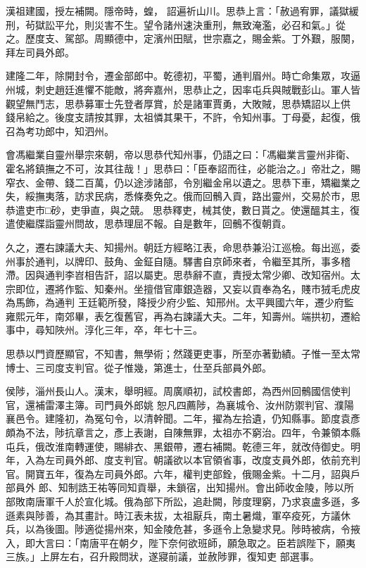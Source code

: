 \begin{pinyinscope}
 漢祖建國，授左補闕。隱帝時，蝗，
 詔遍祈山川。思恭上言：「赦過宥罪，議獄緩刑，茍獄訟平允，則災害不生。望令諸州速決重刑，無致淹濫，必召和氣。」從之。歷度支、駕部。周顯德中，定濱州田賦，世宗嘉之，賜金紫。丁外艱，服闋，拜左司員外郎。



 建隆二年，除開封令，遷金部郎中。乾德初，平蜀，通判眉州。時亡命集眾，攻逼州城，刺史趙廷進懼不能敵，將奔嘉州，思恭止之，因率屯兵與賊戰彭山。軍人皆觀望無鬥志，思恭募軍士先登者厚賞，於是諸軍賈勇，大敗賊，思恭矯詔以上供
 錢帛給之。後度支請按其罪，太祖憐其果干，不許，令知州事。丁母憂，起復，俄召為考功郎中，知泗州。



 會馮繼業自靈州舉宗來朝，帝以思恭代知州事，仍語之曰：「馮繼業言靈州非衛、霍名將鎮撫之不可，汝其往哉！」思恭曰：「臣奉詔而往，必能治之。」帝壯之，賜窄衣、金帶、錢二百萬，仍以途涉諸部，令別繼金帛以遺之。思恭下車，矯繼業之失，綏撫夷落，訪求民病，悉條奏免之。俄而回鶻入貢，路出靈州，交易於市，思恭遣吏市□砂，吏爭直，與之競。
 思恭釋吏，械其使，數日貰之。使還醞其主，復遣使繼牒詣靈州問故，思恭理屈不報。自是數年，回鶻不復朝貢。



 久之，遷右諫議大夫、知揚州。朝廷方經略江表，命思恭兼沿江巡檢。每出巡，委州事於通判，以牌印、鼓角、金鉦自隨。驛書自京師來者，令繼至其所，事多稽滯。因與通判李岧相告訐，詔以屬吏。思恭辭不直，責授太常少卿、改知宿州。太宗即位，遷將作監、知秦州。坐擅借官庫銀造器，又妄以貢奉為名，賤市狨毛虎皮為馬飾，為通判
 王廷範所發，降授少府少監、知邢州。太平興國六年，遷少府監雍熙元年，南郊畢，表乞復舊官，再為右諫議大夫。二年，知壽州。端拱初，遷給事中，尋知陜州。淳化三年，卒，年七十三。



 思恭以門資歷顯官，不知書，無學術；然踐更吏事，所至亦著勤績。子惟一至太常博士、三司度支判官。從子惟幾，第進士，仕至兵部員外郎。



 侯陟，淄州長山人。漢末，舉明經。周廣順初，試校書郎，為西州回鶻國信使判官，還補雷澤主簿。司門員外郎姚
 恕凡四薦陟，為襄城令、汝州防禦判官、濮陽襄邑令。建隆初，為冤句令，以清幹聞。二年，擢為左拾遺，仍知縣事。節度袁彥頗為不法，陟抗章言之，彥上表謝，自陳無罪，太祖亦不窮治。四年，令兼領本縣屯兵，俄改淮南轉運使，賜緋衣、黑銀帶，遷右補闕。乾德三年，就改侍御史。明年，入為左司員外郎、度支判官。朝議欲以本官領省事，改度支員外郎，依前充判官。開寶五年，復為左司員外郎。六年，權判吏部銓，俄賜金紫。十二月，詔與戶部員外
 郎、知制誥王祐等同知貢舉，未鎖宿，出知揚州。會出師收金陵，陟以所部敗南唐軍千人於宣化城。俄為部下所訟，追赴闕，陟度理窮，乃求哀盧多遜，多遜素與陟善，為其畫計。時江表未拔，太祖厭兵，南土暑熾，軍卒疫死，方議休兵，以為後圖。陟適從揚州來，知金陵危甚，多遜令上急變求見。陟時被病，令掖入，即大言曰：「南唐平在朝夕，陛下奈何欲班師，願急取之。臣若誤陛下，願夷三族。」上屏左右，召升殿問狀，遂寢前議，並赦陟罪，復知吏
 部選事。




\end{pinyinscope}
